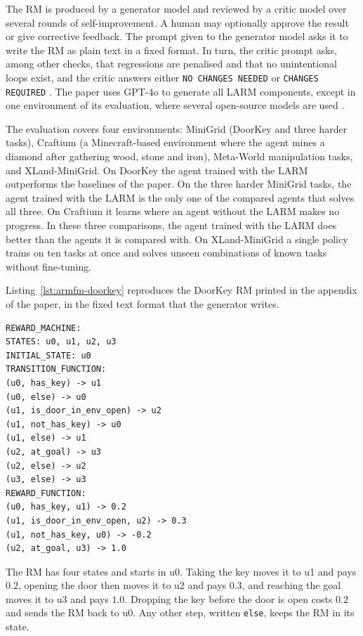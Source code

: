 \documentclass[11pt,english,listoffigures,listoftables]{tfgetsinf}
\begin{document}
The RM is produced by a generator model and reviewed by a critic model over several rounds of self-improvement. A human may optionally approve the result or give corrective feedback. The prompt given to the generator model asks it to write the RM as plain text in a fixed format. In turn, the critic prompt asks, among other checks, that regressions are penalised and that no unintentional loops exist, and the critic answers either \texttt{NO CHANGES NEEDED} or \texttt{CHANGES REQUIRED} \cite[pp.~26--27]{creus2026armfm}. The paper uses GPT-4o to generate all LARM components, except in one environment of its evaluation, where several open-source models are used \cite[p.~4]{creus2026armfm}.

The evaluation covers four environments: MiniGrid (DoorKey and three harder tasks), Craftium (a Minecraft-based environment where the agent mines a diamond after gathering wood, stone and iron), Meta-World manipulation tasks, and XLand-MiniGrid. On DoorKey the agent trained with the LARM outperforms the baselines of the paper. On the three harder MiniGrid tasks, the agent trained with the LARM is the only one of the compared agents that solves all three. On Craftium it learns where an agent without the LARM makes no progress. In these three comparisons, the agent trained with the LARM does better than the agents it is compared with. On XLand-MiniGrid a single policy trains on ten tasks at once and solves unseen combinations of known tasks without fine-tuning.

Listing~\ref{lst:armfm-doorkey} reproduces the DoorKey RM printed in the appendix of the paper, in the fixed text format that the generator writes.

\noindent\begin{minipage}{\linewidth}
\begin{lstlisting}[style=rm,caption={The DoorKey RM printed by ARM-FM (page 30 of the paper).},label={lst:armfm-doorkey}]
REWARD_MACHINE:
STATES: u0, u1, u2, u3
INITIAL_STATE: u0
TRANSITION_FUNCTION:
(u0, has_key) -> u1
(u0, else) -> u0
(u1, is_door_in_env_open) -> u2
(u1, not_has_key) -> u0
(u1, else) -> u1
(u2, at_goal) -> u3
(u2, else) -> u2
(u3, else) -> u3
REWARD_FUNCTION:
(u0, has_key, u1) -> 0.2
(u1, is_door_in_env_open, u2) -> 0.3
(u1, not_has_key, u0) -> -0.2
(u2, at_goal, u3) -> 1.0
\end{lstlisting}
\end{minipage}

The RM has four states and starts in u0. Taking the key moves it to u1 and pays $0.2$, opening the door then moves it to u2 and pays $0.3$, and reaching the goal moves it to u3 and pays $1.0$. Dropping the key before the door is open costs $0.2$ and sends the RM back to u0. Any other step, written \texttt{else}, keeps the RM in its state.
\end{document}
